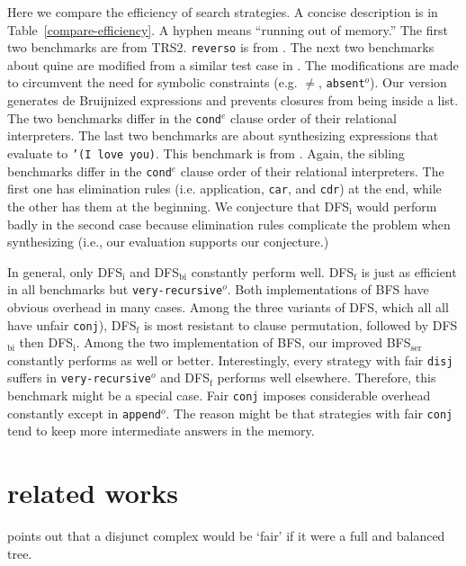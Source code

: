 \documentclass[format=acmlarge, review=true, authordraft=true]{acmart}
\newcommand{\conde}{\texttt{cond$^e$}}
\newcommand{\conj}{\texttt{conj}}
\newcommand{\disj}{\texttt{disj}}
\newcommand{\veryrecursiveo}{\texttt{very-recursive$^o$}}
\newcommand{\appendo}{\texttt{append$^o$}}
\newcommand{\DFSi }[0]{DFS$_\textrm{i}$}
\newcommand{\DFSf }[0]{DFS$_\textrm{f}$}
\newcommand{\DFSbi}[0]{DFS$_\textrm{bi}$}
\newcommand{\BFSser}[0]{BFS$_\textrm{ser}$}
\begin{document}
Here we compare the efficiency of search strategies. A concise 
description is in Table~\ref{compare-efficiency}. A hyphen means ``running out of 
memory.'' The first two benchmarks are from 
TRS2. \texttt{reverso} is from 
\citet{rozplokhas2018improving}. The next two benchmarks 
about quine are modified from a similar test case in \citet{byrd2017unified}. 
The modifications are made 
to circumvent the need for symbolic constraints (e.g. $\neq$, 
\texttt{absent$^o$}). Our version generates de 
Bruijnized expressions and prevents closures from being inside a list. The two 
benchmarks differ in the \conde{} clause order of their relational 
interpreters. 
The last two 
benchmarks are about synthesizing expressions that evaluate to \texttt{'(I love 
you)}. This benchmark is from \citet{byrd2017unified}. Again, the 
sibling benchmarks differ in the \conde{} clause order of their relational 
interpreters. The first one 
has elimination rules (i.e. application, \texttt{car}, and \texttt{cdr}) at the 
end, while the other has them at the beginning. We conjecture that \DFSi{} 
would 
perform badly in the second case because elimination rules complicate the 
problem when synthesizing (i.e., our evaluation supports our conjecture.)

In general, only \DFSi{} and \DFSbi{} constantly perform well. \DFSf{} 
is just as 
efficient in all benchmarks but \veryrecursiveo. Both implementations of BFS have obvious 
overhead in many cases. Among the three variants of DFS, which all all have unfair \conj{}),
\DFSf{} is most resistant to clause permutation, followed by 
\DFSbi{} then 
\DFSi{}. Among the two implementation of BFS, our improved \BFSser{} constantly performs as well 
or 
better. Interestingly, every strategy with fair \disj{} suffers in 
\veryrecursiveo{} and \DFSf{} performs well elsewhere. 
Therefore, this 
benchmark might be a special case. Fair \conj{} imposes considerable overhead 
constantly except in \appendo. The reason might be that strategies with 
fair \conj{} tend to keep more intermediate answers in the memory.


\section{related works}

\citet{yang2010adventures} points out that a disjunct complex would be `fair' 
if it were a full and balanced tree.
\end{document}
